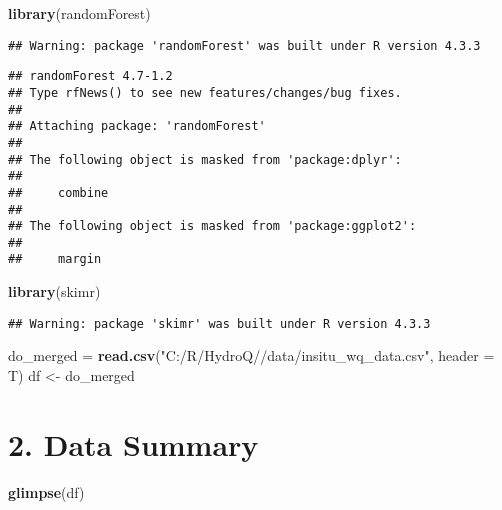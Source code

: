 \documentclass[
]{article}
\newenvironment{Shaded}{\begin{snugshade}}{\end{snugshade}}
\newcommand{\AttributeTok}[1]{\textcolor[rgb]{0.13,0.29,0.53}{#1}}
\newcommand{\FunctionTok}[1]{\textcolor[rgb]{0.13,0.29,0.53}{\textbf{#1}}}
\newcommand{\NormalTok}[1]{#1}
\newcommand{\OtherTok}[1]{\textcolor[rgb]{0.56,0.35,0.01}{#1}}
\newcommand{\StringTok}[1]{\textcolor[rgb]{0.31,0.60,0.02}{#1}}
\begin{document}
\begin{Shaded}
\begin{Highlighting}[]
\FunctionTok{library}\NormalTok{(randomForest)}
\end{Highlighting}
\end{Shaded}

\begin{verbatim}
## Warning: package 'randomForest' was built under R version 4.3.3
\end{verbatim}

\begin{verbatim}
## randomForest 4.7-1.2
## Type rfNews() to see new features/changes/bug fixes.
## 
## Attaching package: 'randomForest'
## 
## The following object is masked from 'package:dplyr':
## 
##     combine
## 
## The following object is masked from 'package:ggplot2':
## 
##     margin
\end{verbatim}

\begin{Shaded}
\begin{Highlighting}[]
\FunctionTok{library}\NormalTok{(skimr)}
\end{Highlighting}
\end{Shaded}

\begin{verbatim}
## Warning: package 'skimr' was built under R version 4.3.3
\end{verbatim}

\begin{Shaded}
\begin{Highlighting}[]
\NormalTok{do\_merged }\OtherTok{=} \FunctionTok{read.csv}\NormalTok{(}\StringTok{"C:/R/HydroQ//data/insitu\_wq\_data.csv"}\NormalTok{, }\AttributeTok{header =}\NormalTok{ T)}
\NormalTok{df }\OtherTok{\textless{}{-}}\NormalTok{ do\_merged}
\end{Highlighting}
\end{Shaded}

\hypertarget{data-summary}{%
\section{\texorpdfstring{\textbf{2. Data
Summary}}{2. Data Summary}}\label{data-summary}}

\begin{Shaded}
\begin{Highlighting}[]
\FunctionTok{glimpse}\NormalTok{(df)}
\end{Highlighting}
\end{Shaded}
\end{document}
